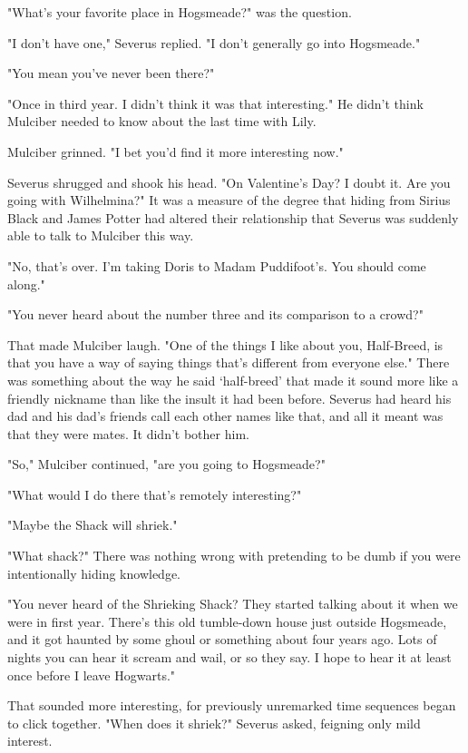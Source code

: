 "What's your favorite place in Hogsmeade?" was the question.

"I don't have one," Severus replied. "I don't generally go into Hogsmeade."

"You mean you've never been there?"

"Once in third year. I didn't think it was that interesting." He didn't think Mulciber needed to know about the last time with Lily.

Mulciber grinned. "I bet you'd find it more interesting now."

Severus shrugged and shook his head. "On Valentine's Day? I doubt it. Are you going with Wilhelmina?" It was a measure of the degree that hiding from Sirius Black and James Potter had altered their relationship that Severus was suddenly able to talk to Mulciber this way.

"No, that's over. I'm taking Doris to Madam Puddifoot's. You should come along."

"You never heard about the number three and its comparison to a crowd?"

That made Mulciber laugh. "One of the things I like about you, Half-Breed, is that you have a way of saying things that's different from everyone else." There was something about the way he said `half-breed' that made it sound more like a friendly nickname than like the insult it had been before. Severus had heard his dad and his dad's friends call each other names like that, and all it meant was that they were mates. It didn't bother him.

"So," Mulciber continued, "are you going to Hogsmeade?"

"What would I do there that's remotely interesting?"

"Maybe the Shack will shriek."

"What shack?" There was nothing wrong with pretending to be dumb if you were intentionally hiding knowledge.

"You never heard of the Shrieking Shack? They started talking about it when we were in first year. There's this old tumble-down house just outside Hogsmeade, and it got haunted by some ghoul or something about four years ago. Lots of nights you can hear it scream and wail, or so they say. I hope to hear it at least once before I leave Hogwarts."

That sounded more interesting, for previously unremarked time sequences began to click together. "When does it shriek?" Severus asked, feigning only mild interest.

